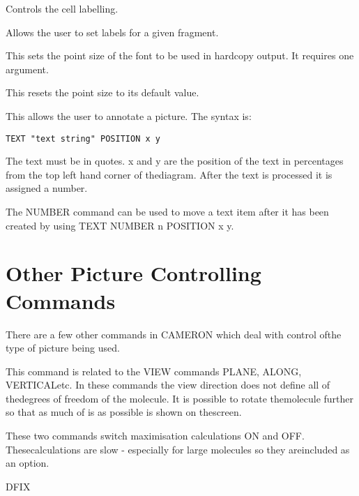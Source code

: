 \documentclass[10pt,a4paper]{report}
\begin{document}
\bigskip{}Controls the cell labelling.

\bigskip{}Allows the user to set labels for a given fragment.

\bigskip{}

This sets the point size of the font to be used in hardcopy output. It requires one argument.

\bigskip{}This resets the point size to its default value.

\bigskip{}



\bigskip{}This allows the user to annotate a picture. The syntax is:\small\begin{verbatim}TEXT "text string" POSITION x y\end{verbatim}\normalsize

The text must be in quotes. x and y are the position of the text in percentages from the top left hand corner of thediagram. After the text is processed it is assigned a number.

\bigskip{}The NUMBER command can be used to move a text item after it has been created by using TEXT NUMBER n POSITION x y.  \chapter{Other Picture Controlling Commands}

There are a few other commands in CAMERON which deal with control ofthe type of picture being used.

\bigskip{}



This command is related to the VIEW commands PLANE, ALONG, VERTICALetc. In these commands the view direction does not define all of thedegrees of freedom of the molecule. It is possible to rotate themolecule further so that as much of is as possible is shown on thescreen.

\bigskip{}

\bigskip{}

These two commands switch maximisation calculations ON and OFF. Thesecalculations are slow - especially for large molecules so they areincluded as an option.

\bigskip{}



DFIX
\end{document}
